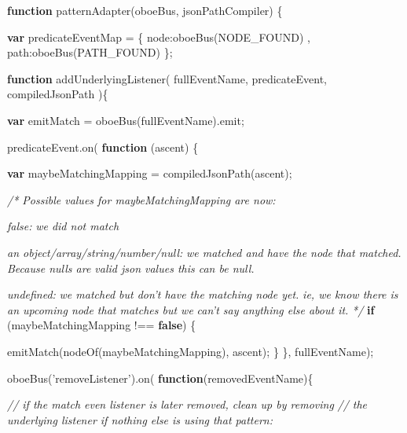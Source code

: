 \documentclass[12pt, ]{article}
\newenvironment{Shaded}{}{}
\newcommand{\KeywordTok}[1]{\textcolor[rgb]{0.00,0.44,0.13}{\textbf{{#1}}}}
\newcommand{\DataTypeTok}[1]{\textcolor[rgb]{0.56,0.13,0.00}{{#1}}}
\newcommand{\StringTok}[1]{\textcolor[rgb]{0.25,0.44,0.63}{{#1}}}
\newcommand{\CommentTok}[1]{\textcolor[rgb]{0.38,0.63,0.69}{\textit{{#1}}}}
\newcommand{\OtherTok}[1]{\textcolor[rgb]{0.00,0.44,0.13}{{#1}}}
\newcommand{\FunctionTok}[1]{\textcolor[rgb]{0.02,0.16,0.49}{{#1}}}
\newcommand{\NormalTok}[1]{{#1}}
\begin{document}
\begin{Shaded}
\begin{Highlighting}[]
\KeywordTok{function} \FunctionTok{patternAdapter}\NormalTok{(oboeBus, jsonPathCompiler) \{}

   \KeywordTok{var} \NormalTok{predicateEventMap = \{}
      \DataTypeTok{node}\NormalTok{:}\FunctionTok{oboeBus}\NormalTok{(NODE_FOUND)}
   \NormalTok{,  }\DataTypeTok{path}\NormalTok{:}\FunctionTok{oboeBus}\NormalTok{(PATH_FOUND)}
   \NormalTok{\};}

   \KeywordTok{function} \FunctionTok{addUnderlyingListener}\NormalTok{( fullEventName, predicateEvent, compiledJsonPath )\{}

      \KeywordTok{var} \NormalTok{emitMatch = }\FunctionTok{oboeBus}\NormalTok{(fullEventName).}\FunctionTok{emit}\NormalTok{;}
   
      \OtherTok{predicateEvent}\NormalTok{.}\FunctionTok{on}\NormalTok{( }\KeywordTok{function} \NormalTok{(ascent) \{}

         \KeywordTok{var} \NormalTok{maybeMatchingMapping = }\FunctionTok{compiledJsonPath}\NormalTok{(ascent);}

         \CommentTok{/* Possible values for maybeMatchingMapping are now:}

\CommentTok{          false: }
\CommentTok{          we did not match }

\CommentTok{          an object/array/string/number/null: }
\CommentTok{          we matched and have the node that matched.}
\CommentTok{          Because nulls are valid json values this can be null.}

\CommentTok{          undefined:}
\CommentTok{          we matched but don't have the matching node yet.}
\CommentTok{          ie, we know there is an upcoming node that matches but we }
\CommentTok{          can't say anything else about it. }
\CommentTok{          */}
         \KeywordTok{if} \NormalTok{(maybeMatchingMapping !== }\KeywordTok{false}\NormalTok{) \{}

            \FunctionTok{emitMatch}\NormalTok{(}\FunctionTok{nodeOf}\NormalTok{(maybeMatchingMapping), ascent);}
         \NormalTok{\}}
      \NormalTok{\}, fullEventName);}
   
      \FunctionTok{oboeBus}\NormalTok{(}\StringTok{'removeListener'}\NormalTok{).}\FunctionTok{on}\NormalTok{( }\KeywordTok{function}\NormalTok{(removedEventName)\{}

         \CommentTok{// if the match even listener is later removed, clean up by removing}
         \CommentTok{// the underlying listener if nothing else is using that pattern:}
      

\end{Highlighting}
\end{Shaded}
\end{document}
